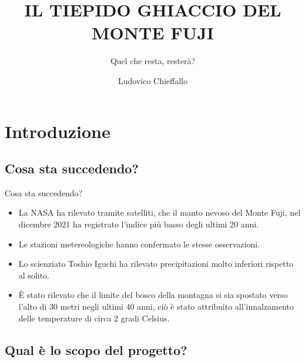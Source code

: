 \documentclass{beamer}
\title{IL TIEPIDO GHIACCIO DEL MONTE FUJI}
\subtitle{Quel che resta, resterà?}
\author{Ludovico Chieffallo}
\date{\nodate}
\institute{Alma Mater Studiorum, Università di Bologna\\
\bigskip
\texttt{[image: unibo.png]}
}
\begin{document}
\maketitle
{}


\section{Introduzione}
\subsection{Cosa sta succedendo?}
\begin{frame}{Cosa sta succedendo?}\pause
\begin{itemize}
    
\item La NASA ha rilevato tramite satelliti, che il manto nevoso del Monte Fuji, nel dicembre 2021 ha registrato l'indice più basso degli ultimi 20 anni.\pause

\item Le stazioni metereologiche hanno confermato le stesse osservazioni.\pause

\item Lo scienziato Toshio Iguchi ha rilevato precipitazioni molto inferiori rispetto al solito.\pause

\item È stato rilevato che il limite del bosco della montagna si sia spostato verso l'alto di 30 metri negli ultimi 40 anni, ciò è stato attribuito all'innalzamento delle temperature di circa 2 gradi Celsius.
\end{itemize}
\end{frame}

\subsection{Qual è lo scopo del progetto?}
\end{document}
